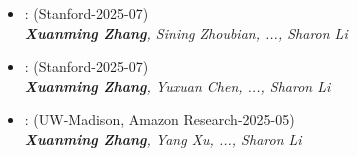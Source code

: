 \documentclass[zh]{resume}
\begin{document}
\begin{itemize}
  \item {}: (Stanford-2025-07)\\
  \textit{\textbf{Xuanming Zhang}, Sining Zhoubian, ..., Sharon Li}
  
  \item {}: (Stanford-2025-07)\\
  \textit{\textbf{Xuanming Zhang}, Yuxuan Chen, ..., Sharon Li}
  
  \item {}: (UW-Madison, Amazon Research-2025-05)\\
  \textit{\textbf{Xuanming Zhang}, Yang Xu, ..., Sharon Li}

  
\end{itemize}
\end{document}
